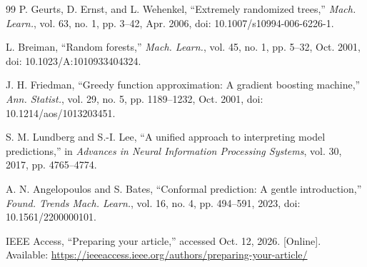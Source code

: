 \documentclass[10pt,letterpaper,twocolumn]{article}
\begin{document}
\begin{thebibliography}{99}
P. Geurts, D. Ernst, and L. Wehenkel, ``Extremely randomized trees,'' \emph{Mach. Learn.}, vol. 63, no. 1, pp. 3--42, Apr. 2006, doi: 10.1007/s10994-006-6226-1.

L. Breiman, ``Random forests,'' \emph{Mach. Learn.}, vol. 45, no. 1, pp. 5--32, Oct. 2001, doi: 10.1023/A:1010933404324.

J. H. Friedman, ``Greedy function approximation: A gradient boosting machine,'' \emph{Ann. Statist.}, vol. 29, no. 5, pp. 1189--1232, Oct. 2001, doi: 10.1214/aos/1013203451.

S. M. Lundberg and S.-I. Lee, ``A unified approach to interpreting model predictions,'' in \emph{Advances in Neural Information Processing Systems}, vol. 30, 2017, pp. 4765--4774.

A. N. Angelopoulos and S. Bates, ``Conformal prediction: A gentle introduction,'' \emph{Found. Trends Mach. Learn.}, vol. 16, no. 4, pp. 494--591, 2023, doi: 10.1561/2200000101.

IEEE Access, ``Preparing your article,'' accessed Oct. 12, 2026. [Online]. Available: \url{https://ieeeaccess.ieee.org/authors/preparing-your-article/}
\end{thebibliography}
\end{document}
